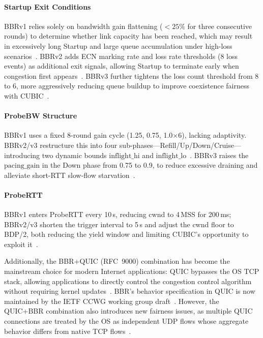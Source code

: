 \documentclass[a4paper,fleqn]{cas-sc}
\begin{document}
\paragraph{Startup Exit Conditions}
BBRv1 relies solely on bandwidth gain flattening (${<}25\%$ for three consecutive
rounds) to determine whether link capacity has been reached, which may result in
excessively long Startup and large queue accumulation under high-loss
scenarios~\citep{hock2017bbr}. BBRv2 adds ECN marking rate and loss rate
thresholds (8 loss events) as additional exit signals, allowing Startup to
terminate early when congestion first appears~\citep{cardwell2019bbrv2}. BBRv3
further tightens the loss count threshold from 8 to 6, more aggressively reducing
queue buildup to improve coexistence fairness with
CUBIC~\citep{cardwell2023bbrv3}.

\paragraph{ProbeBW Structure}
BBRv1 uses a fixed 8-round gain cycle (1.25, 0.75, 1.0$\times$6), lacking
adaptivity. BBRv2/v3 restructure this into four sub-phases---Refill/Up/Down/Cruise---introducing
two dynamic bounds $\mathrm{inflight\_hi}$ and
$\mathrm{inflight\_lo}$~\citep{cardwell2019bbrv2}. BBRv3 raises the
$\mathrm{pacing\_gain}$ in the Down phase from 0.75 to 0.9, to reduce excessive
draining and alleviate short-RTT slow-flow starvation~\citep{cardwell2023bbrv3}.

\paragraph{ProbeRTT}
BBRv1 enters ProbeRTT every 10\,s, reducing cwnd to 4\,MSS for 200\,ms;
BBRv2/v3 shorten the trigger interval to 5\,s and adjust the cwnd floor to
BDP/2, both reducing the yield window and limiting CUBIC's opportunity to
exploit it~\citep{cardwell2019bbrv2,abrol2026bbr}.

Additionally, the BBR+QUIC (RFC~9000) combination has become the mainstream
choice for modern Internet applications: QUIC bypasses the OS TCP stack, allowing
applications to directly control the congestion control algorithm without
requiring kernel updates~\citep{rfc9000}. BBR's behavior specification in QUIC is
now maintained by the IETF CCWG working group
draft~\citep{ietf_ccwg_bbr}. However, the QUIC+BBR combination also introduces
new fairness issues, as multiple QUIC connections are treated by the OS as
independent UDP flows whose aggregate behavior differs from native TCP
flows~\citep{abrol2026bbr}.
\end{document}
